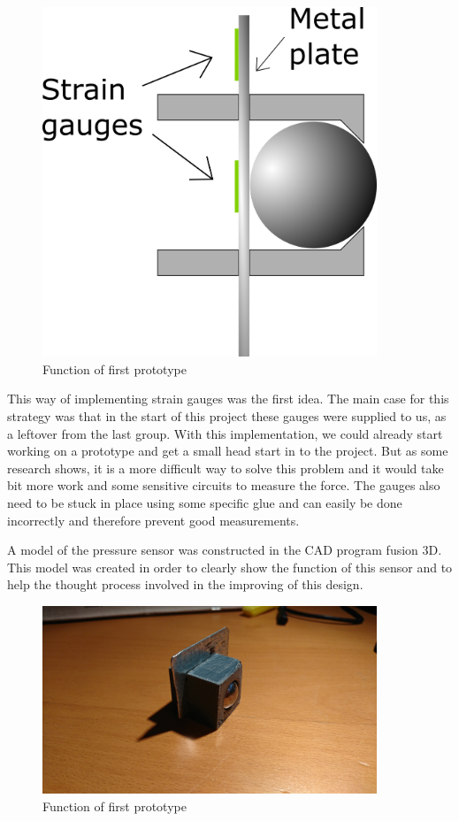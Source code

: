 \begin{figure}[H]
\begin{center}
	\includegraphics[width = 10cm]{Figures/Press_sens_func_1.png}
	\caption{Function of first prototype}
	\label{Press_sens_prot_1}
\end{center}
\end{figure}

This way of implementing strain gauges was the first idea. 
The main case for this strategy was that in the start of this project these gauges were supplied to us, as a leftover from the last group. With this implementation, we could already start working on a prototype and get a small head start in to the project. But as some research shows, it is a more difficult way to solve this problem and it would take bit more work and some sensitive circuits to measure the force. The gauges also need to be stuck in place using some specific glue and can easily be done incorrectly and therefore prevent good measurements.

A model of the pressure sensor was constructed in the CAD program fusion 3D. This model was created in order to clearly show the function of this sensor and to help the thought process involved in the improving of this design.

\begin{figure}[H]
\begin{center}
	\includegraphics[width = 10cm]{Figures/Press_sens_prot_1.png}
	\caption{Function of first prototype}
	\label{Press_sens_prot_1}
\end{center}
\end{figure}


